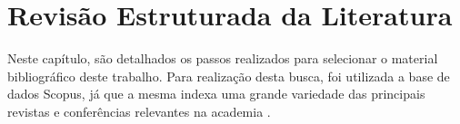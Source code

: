 \chapter{Revisão Estruturada da Literatura}   
\label{ch:revisao}

Neste capítulo, são detalhados os passos realizados para selecionar o material bibliográfico deste trabalho. Para realização desta busca, foi utilizada a base de dados Scopus, já que a mesma indexa uma grande variedade das principais revistas e conferências relevantes na academia \cite{elsevier2022}.











